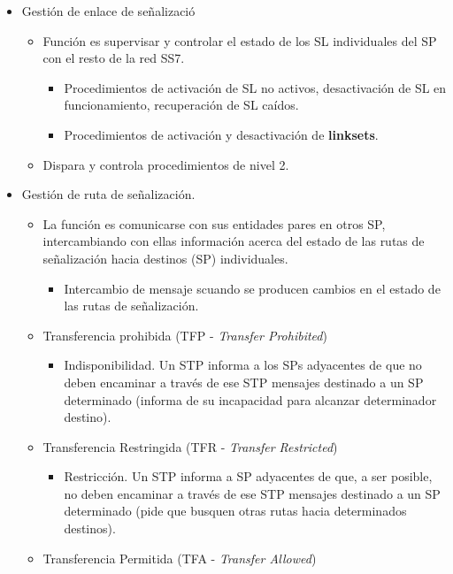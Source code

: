 \documentclass[10pt,portrait, twocolumn]{article}
\begin{document}
	\begin{itemize}
	\item Gestión de enlace de señalizació
		\begin{itemize}
		\item Función es supervisar y controlar el estado de los SL individuales del SP con el resto de la red SS7.
			\begin{itemize}
			\item Procedimientos de activación de SL no activos, desactivación de SL en funcionamiento, recuperación de SL caídos.
			\item Procedimientos de activación y desactivación de \textbf{linksets}.
			\end{itemize}
		\item Dispara y controla procedimientos de nivel 2.
		\end{itemize}
	\item Gestión de ruta de señalización.
		\begin{itemize}
		\item La función es comunicarse con sus entidades pares en otros SP, intercambiando con ellas información acerca del estado de las rutas de señalización hacia destinos (SP) individuales.
			\begin{itemize}
			\item Intercambio de mensaje scuando se producen cambios en el estado de las rutas de señalización.
			\end{itemize}
		\item Transferencia prohibida (TFP - \textit{Transfer Prohibited})
			\begin{itemize}
			\item Indisponibilidad. Un STP informa a los SPs adyacentes de que no deben encaminar a través de ese STP mensajes destinado a un SP determinado (informa de su incapacidad para alcanzar determinador destino).
			\end{itemize}
		\item Transferencia Restringida (TFR - \textit{Transfer Restricted})
			\begin{itemize}
			\item Restricción. Un STP informa a SP adyacentes de que, a ser posible, no deben encaminar a través de ese STP mensajes destinado a un SP determinado (pide que busquen otras rutas hacia determinados destinos).
			\end{itemize}
		\item Transferencia Permitida (TFA - \textit{Transfer Allowed})
			\begin{itemize}

\end{itemize}
\end{itemize}
\end{itemize}
\end{document}
